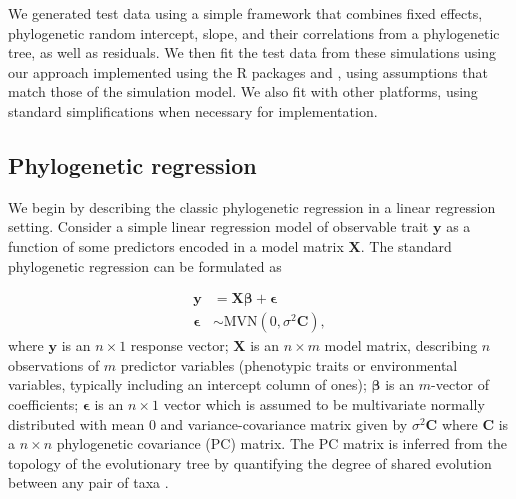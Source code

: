 \documentclass[12pt]{article}
\begin{document}
\newcommand{\bX}{{\mathbf X}}
\newcommand{\bbeta}{{\boldsymbol \beta}}
\newcommand{\bmu}{{\boldsymbol \mu}}
\newcommand{\bY}{{\mathbf y}}  %
\newcommand{\bC}{{\mathbf C}}
\newcommand{\bZ}{{\mathbf Z}}
\newcommand{\bb}{{\mathbf b}}
\newcommand{\besp}{{\boldsymbol \epsilon}}
\newcommand{\bSigma}{{\boldsymbol \Sigma}}

We generated test data using a simple framework that combines fixed effects, phylogenetic random intercept, slope, and their correlations from a phylogenetic tree, as well as residuals. 
We then fit the test data from these simulations using our approach implemented using the R packages  \citep{bates2015fitting} and  \citep{brooks2017glmmTMB}, using assumptions that match those of the simulation model. We also fit with other platforms, using standard simplifications when necessary for implementation.

\subsection*{Phylogenetic regression}

We begin by describing the classic phylogenetic regression in a linear regression setting.
Consider a simple linear regression model of observable trait $\bY$ as a function of some predictors encoded in a model matrix $\bX$. 
The standard phylogenetic regression can be formulated as


\begin{equation}
\begin{aligned}
\bY & = \bX \bbeta + \besp  \\
\besp & \sim \textrm{MVN}(0,\sigma^{2} \bC), 
\label{eq:gls}
\end{aligned}
\end{equation}
where $\bY$ is an $n \times 1$ response vector; $\bX$ is an $n \times m$ model matrix, describing $n$ observations of $m$ predictor variables (phenotypic traits or environmental variables, typically including an intercept column of ones); $\bbeta$ is an $m$-vector of coefficients; $\besp$ is an $n \times 1$ vector which is assumed to be multivariate normally distributed with mean $0$ and variance-covariance matrix given by $\sigma^{2} \bC$ where $\bC$ is a $n \times n$ phylogenetic covariance (PC) matrix.
The PC matrix is inferred from the topology of the evolutionary tree by quantifying the degree of shared evolution between any pair of taxa \citep{garamszegi2014modern}.
\end{document}
